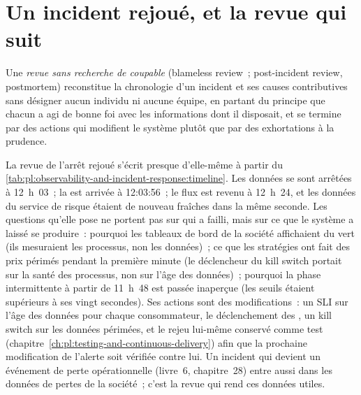 \section{Un incident rejoué, et la revue qui suit}

\begin{definition}\label{def:pl:observability-and-incident-response:blameless}
Une \emph{revue sans recherche de coupable} (blameless review~; post-incident review, postmortem) reconstitue la chronologie d'un incident et ses causes contributives
sans désigner aucun individu ni aucune équipe, en partant du principe que chacun a agi de bonne foi avec les informations dont il disposait, et
se termine par des actions qui modifient le système plutôt que par des exhortations à la prudence.
\end{definition}

La revue de l'arrêt rejoué s'écrit presque d'elle-même à partir du \cref{tab:pl:observability-and-incident-response:timeline}. Les données se sont arrêtées à 12~h~03~; la
 est arrivée à 12:03:56~; le flux est revenu à 12~h~24, et les données du service de risque étaient de nouveau fraîches dans la même seconde. Les questions qu'elle pose ne
portent pas sur qui a failli, mais sur ce que le système a laissé se produire~: pourquoi les tableaux de bord de la société affichaient du vert (ils mesuraient les processus, non les données)~; ce que les stratégies
ont fait des prix périmés pendant la première minute (le déclencheur du kill switch portait sur la santé des processus, non sur l'âge des données)~; pourquoi la phase intermittente à partir de
11~h~48 est passée inaperçue (les seuils étaient supérieurs à ses vingt secondes). Ses actions sont des modifications~: un SLI sur l'âge des données pour chaque consommateur, le déclenchement des ,
un kill switch sur les données périmées, et le rejeu lui-même conservé comme test (chapitre~\ref{ch:pl:testing-and-continuous-delivery}) afin que la prochaine
modification de l'alerte soit vérifiée contre lui. Un incident qui devient un événement de perte opérationnelle (livre~6, chapitre~28) entre aussi dans les données de
pertes de la société~; c'est la revue qui rend ces données utiles.


